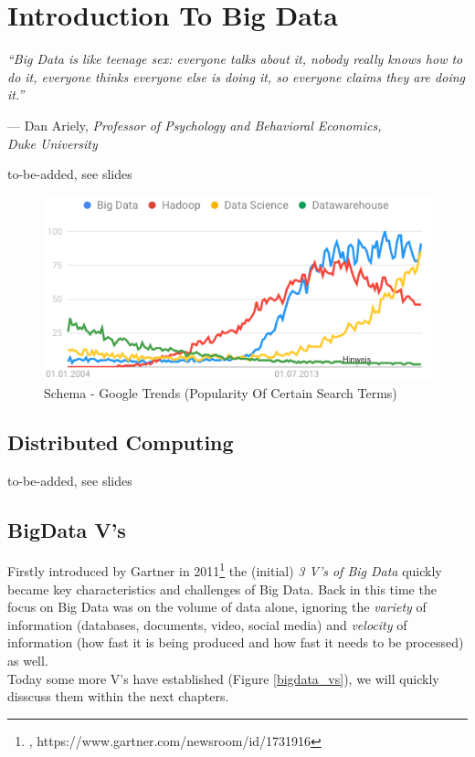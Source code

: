 \chapter{Introduction To Big Data}
\label{chapter_bigdata}
\setlength{\epigraphwidth}{0.95\textwidth}
\setlength\epigraphrule{0pt}
\epigraph{\itshape ``Big Data is like teenage sex: everyone talks about it, nobody really knows how to do it, everyone thinks everyone else is doing it, so everyone claims they are doing it.''}{--- Dan Ariely, \textit{Professor of Psychology and Behavioral Economics,\\ Duke University}}


to-be-added, see slides

\begin{figure}[ht]
	\centering
  \includegraphics[width=1.0\textwidth]{google_trends_bigdata.png}
	\caption{Schema - Google Trends (Popularity Of Certain Search Terms)}
	\label{google_trends_bigdata}
\end{figure}


\section{Distributed Computing}
\label{bd_hwe}

to-be-added, see slides

\newpage
\section{BigData V's}
\label{bd_vs}
Firstly introduced by Gartner in 2011\footnote{\cite{GRTNRVS}, https://www.gartner.com/newsroom/id/1731916} the (initial) \textit{3 V's of Big Data} quickly became key characteristics and challenges of Big Data. Back in this time the focus on Big Data was on the volume of data alone, ignoring the \textit{variety} of information (databases, documents, video, social media) and \textit{velocity} of information (how fast it is being produced and how fast it needs to be processed) as well. \\
Today some more V's have established (Figure \ref{bigdata_vs}), we will quickly disscuss them within the next chapters.

